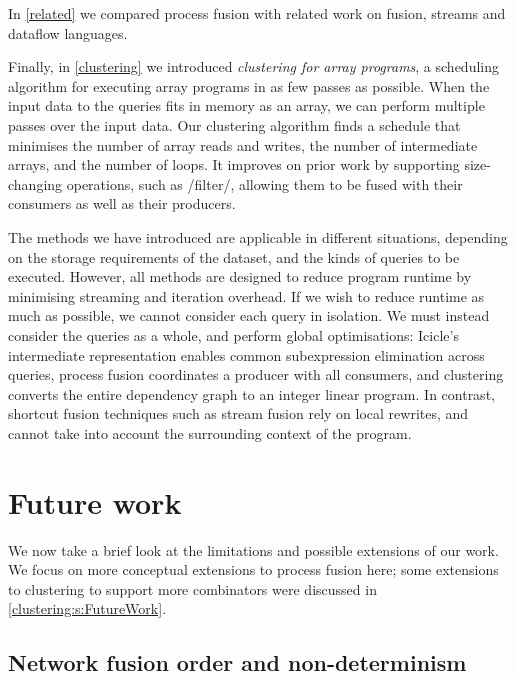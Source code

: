 In \cref{related} we compared process fusion with related work on fusion, streams and dataflow languages.

Finally, in \cref{clustering} we introduced \emph{clustering for array programs}, a scheduling algorithm for executing array programs in as few passes as possible.
When the input data to the queries fits in memory as an array, we can perform multiple passes over the input data.
Our clustering algorithm finds a schedule that minimises the number of array reads and writes, the number of intermediate arrays, and the number of loops.
It improves on prior work by supporting size-changing operations, such as \Hs/filter/, allowing them to be fused with their consumers as well as their producers.

The methods we have introduced are applicable in different situations, depending on the storage requirements of the dataset, and the kinds of queries to be executed.
However, all methods are designed to reduce program runtime by minimising streaming and iteration overhead.
If we wish to reduce runtime as much as possible, we cannot consider each query in isolation.
We must instead consider the queries as a whole, and perform global optimisations: Icicle's intermediate representation enables common subexpression elimination across queries, process fusion coordinates a producer with all consumers, and clustering converts the entire dependency graph to an integer linear program.
In contrast, shortcut fusion techniques such as stream fusion \citep{coutts2007stream} rely on local rewrites, and cannot take into account the surrounding context of the program.

\section{Future work}
\label{related/future}

We now take a brief look at the limitations and possible extensions of our work.
We focus on more conceptual extensions to process fusion here; some extensions to clustering to support more combinators were discussed in \cref{clustering:s:FutureWork}.

\subsection{Network fusion order and non-determinism}

